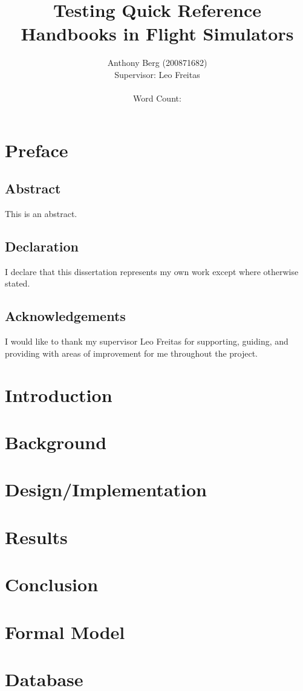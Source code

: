 \documentclass[british, twoside]{report}
\author{Anthony Berg (200871682)\\
Supervisor: Leo Freitas\\\\
Word Count: \wordcount}
\title{Testing Quick Reference Handbooks in Flight Simulators}
\begin{document}
\maketitle

\chapter*{Preface}
\section*{Abstract}
This is an abstract.

\section*{Declaration}
I declare that this dissertation represents my own work except where otherwise stated.

\section*{Acknowledgements}
I would like to thank my supervisor Leo Freitas for supporting, guiding, and providing
with areas of improvement for me throughout the project.

\tableofcontents

\chapter{Introduction}


\chapter{Background}


\chapter{Design/Implementation}


\chapter{Results}


\chapter{Conclusion}


\appendix
\chapter{Formal Model}


\chapter{Database}


\printbibliography[heading=bibintoc, title={References}]
\end{document}
